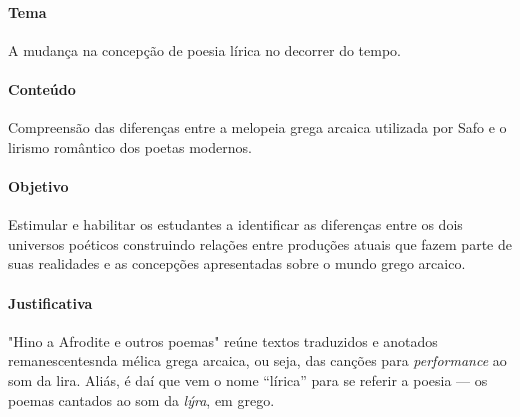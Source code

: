 \documentclass[12pt]{extarticle}
\begin{document}



\paragraph{Tema} A mudança na concepção de poesia lírica no decorrer do tempo.

\paragraph{Conteúdo} Compreensão das diferenças entre a melopeia grega arcaica
utilizada por Safo e o lirismo romântico dos poetas modernos.

\paragraph{Objetivo} Estimular e habilitar os estudantes a identificar as 
diferenças entre os dois universos poéticos construindo relações entre
produções atuais que fazem parte de suas realidades e as concepções 
apresentadas sobre o mundo grego arcaico.

\paragraph{Justificativa} "Hino a Afrodite e outros poemas" reúne textos traduzidos 
e anotados remanescentesnda mélica grega arcaica, ou seja, das canções para 
\textit{performance} ao som da lira. Aliás, é daí que vem o nome ``lírica'' 
para se referir a poesia --- os poemas cantados ao som da \textit{lýra}, em grego.
\end{document}
